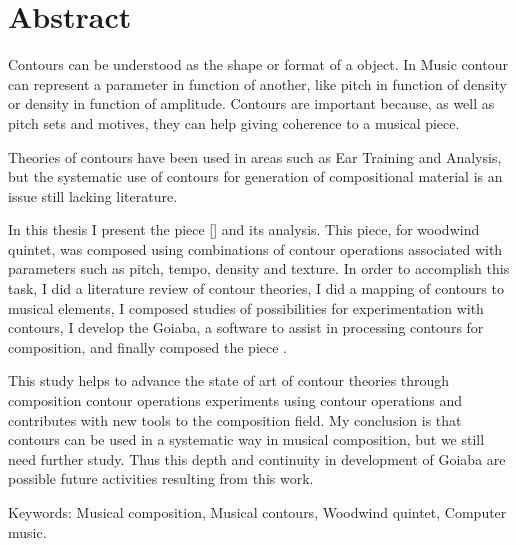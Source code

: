 \chapter*{Abstract}
\label{cha:abstract}

Contours can be understood as the shape or format of a object. In
Music contour can represent a parameter in function of another, like
pitch in function of density or density in function of
amplitude. Contours are important because, as well as pitch sets and
motives, they can help giving coherence to a musical piece.

Theories of contours have been used in areas such as Ear Training and
Analysis, but the systematic use of contours for generation of
compositional material is an issue still lacking literature.

In this thesis I present the piece \obra{} [] and its analysis. This piece, for woodwind quintet,
was composed using combinations of contour operations associated with
parameters such as pitch, tempo, density and texture. In order to
accomplish this task, I did a literature review of contour theories, I
did a mapping of contours to musical elements, I composed studies of
possibilities for experimentation with contours, I develop the Goiaba,
a software to assist in processing contours for composition, and
finally composed the piece \obra{}.

This study helps to advance the state of art of contour theories
through composition contour operations experiments using contour
operations and contributes with new tools to the composition field.
My conclusion is that contours can be used in a systematic way in
musical composition, but we still need further study. Thus this depth
and continuity in development of Goiaba are possible future activities
resulting from this work.

Keywords: Musical composition, Musical contours, Woodwind quintet,
Computer music.
